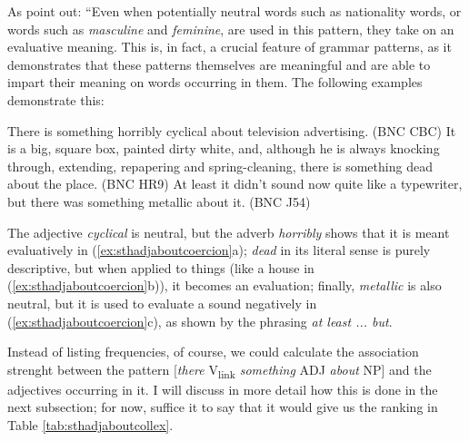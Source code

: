 As \citet[105]{hunston_pattern_2000} point out: ``Even when potentially neutral words such as nationality words, or words such as \textit{masculine} and \textit{feminine}, are used in this pattern, they take on an evaluative meaning. This is, in fact, a crucial feature of grammar patterns, as it demonstrates that these patterns themselves are meaningful and are able to impart their meaning on words occurring in them. The following examples demonstrate this:

\begin{exe}
\ex
\begin{xlist} 
\label{ex:sthadjaboutcoercion}
\ex There is something horribly cyclical about television advertising. (BNC CBC)
\ex It is a big, square box, painted dirty white, and, although he is always knocking through, extending, repapering and spring-cleaning, there is something dead about the place. (BNC HR9)
\ex At least it didn't sound now quite like a typewriter, but there was something metallic about it. (BNC J54)
\end{xlist}
\end{exe}

The adjective \textit{cyclical} is neutral, but the adverb \textit{horribly} shows that it is meant evaluatively in (\ref{ex:sthadjaboutcoercion}a); \textit{dead} in its literal sense is purely descriptive, but when applied to things (like a house in (\ref{ex:sthadjaboutcoercion}b)), it becomes an evaluation; finally, \textit{metallic} is also neutral, but it is used to evaluate a sound negatively in (\ref{ex:sthadjaboutcoercion}c), as shown by the phrasing \textit{at least ... but}.

Instead of listing frequencies, of course, we could calculate the association strenght between the pattern [\textit{there} V\textsubscript{link} \textit{something} ADJ \textit{about} NP] and the adjectives occurring in it. I will discuss in more detail how this is done in the next subsection; for now, suffice it to say that it would give us the ranking in Table \ref{tab:sthadjaboutcollex}.

